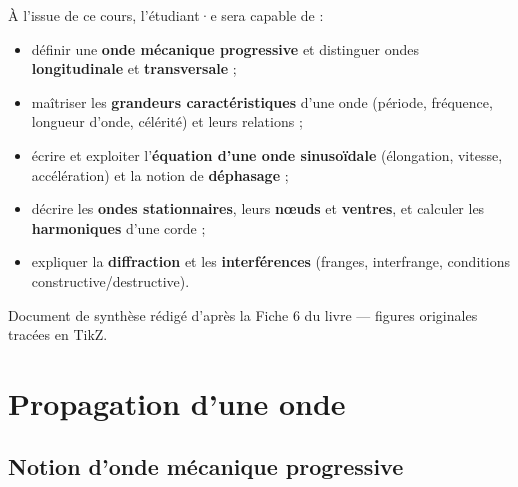 \documentclass[11pt,a4paper]{article}
\begin{document}
\begin{tcolorbox}[boxbase,colback=primary!5,colframe=primary,width=15cm,
    title={\textsc{Objectifs pédagogiques de la fiche}}]
À l'issue de ce cours, l'étudiant·e sera capable de :
\begin{itemize}[leftmargin=1.6em,topsep=2pt,itemsep=1pt]
  \item définir une \textbf{onde mécanique progressive} et distinguer ondes
        \textbf{longitudinale} et \textbf{transversale} ;
  \item maîtriser les \textbf{grandeurs caractéristiques} d'une onde
        (période, fréquence, longueur d'onde, célérité) et leurs relations ;
  \item écrire et exploiter l'\textbf{équation d'une onde sinusoïdale}
        (élongation, vitesse, accélération) et la notion de \textbf{déphasage} ;
  \item décrire les \textbf{ondes stationnaires}, leurs \textbf{nœuds} et
        \textbf{ventres}, et calculer les \textbf{harmoniques} d'une corde ;
  \item expliquer la \textbf{diffraction} et les \textbf{interférences}
        (franges, interfrange, conditions constructive/destructive).
\end{itemize}
\end{tcolorbox}

\vspace{0.45cm}
{\small\color{black!60} Document de synthèse rédigé d'après la Fiche 6 du livre — figures originales tracées en TikZ.}
\par
\endgroup

\newpage
\renewcommand{\contentsname}{\textcolor{primarydark}{Table des matières}}
\tableofcontents
\thispagestyle{fancy}
\newpage

\section{Propagation d'une onde}

\subsection{Notion d'onde mécanique progressive}
\end{document}
